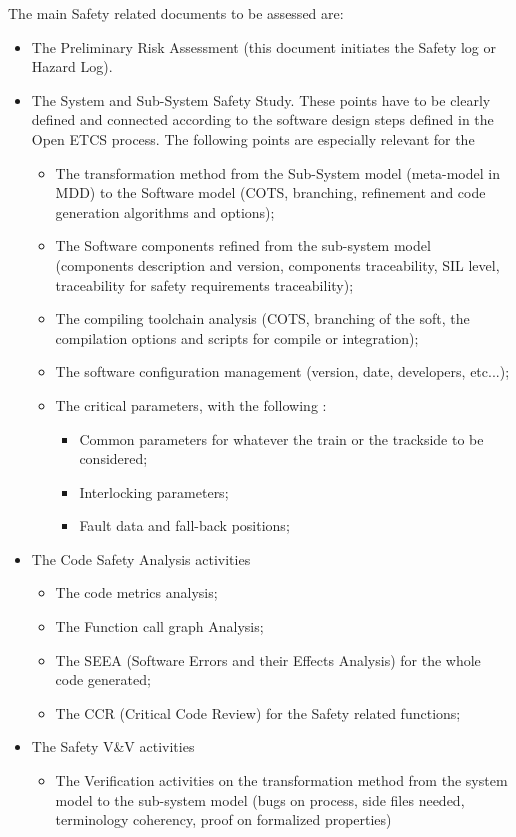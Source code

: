 \documentclass{template/openetcs_article}
\begin{document}
The main Safety related documents to be assessed are:
\begin{itemize}
\item The Preliminary Risk Assessment (this document initiates the Safety log or Hazard Log).
\item The System and Sub-System Safety Study. These points have to be clearly defined and connected according to the software design steps defined in the Open ETCS process. The following points are especially relevant for the
	\begin{itemize}
	\item The transformation method from the Sub-System model (meta-model in MDD) to the Software model (COTS, branching, refinement and code generation algorithms and options);
	\item The Software components refined from the sub-system model (components description and version, components traceability, SIL level, traceability for safety requirements traceability);
	\item The compiling toolchain analysis (COTS, branching of the soft, the compilation options and scripts for compile or integration);
	\item The software configuration management (version, date, developers, etc...);
	\item The critical parameters, with the following :
		\begin{itemize}
		\item Common parameters for whatever the train or the trackside to be considered;
		\item Interlocking parameters;
		\item Fault data and fall-back positions;
		\end{itemize}
	\end{itemize}
\item The Code Safety Analysis activities
	\begin{itemize}
	\item The code metrics analysis;
	\item The Function call graph Analysis;
	\item The SEEA (Software Errors and their Effects Analysis) for the whole code generated;
	\item The CCR (Critical Code Review) for the Safety related functions;
	\end{itemize}
\item The Safety V\&V activities
	\begin{itemize}
	\item The Verification activities on the transformation method from the system model to the sub-system model (bugs on process, side files needed, terminology coherency, proof on formalized properties)

\end{itemize}
\end{itemize}
\end{document}
